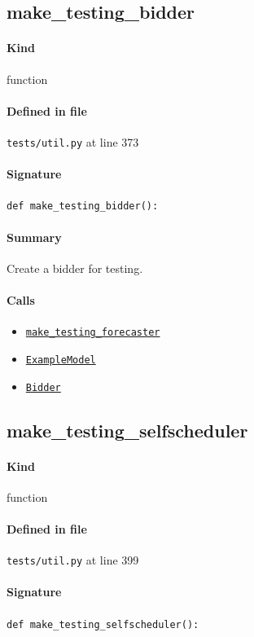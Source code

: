 \documentclass[11pt]{report}
\begin{document}
\subsection{make\_testing\_bidder}
\label{def:tests-util.py:make_testing_bidder:L373}
\paragraph{Kind} function
\paragraph{Defined in file} \texttt{tests/util.py} at line 373
\paragraph{Signature} \texttt{def make\_testing\_bidder():}
\paragraph{Summary} Create a bidder for testing.
\paragraph{Calls}
\begin{itemize}[leftmargin=*]
  \item \hyperref[def:tests-util.py:make_testing_forecaster:L337]{\texttt{make\_testing\_forecaster}}
  \item \hyperref[def:tests-util.py:ExampleModel:L25]{\texttt{ExampleModel}}
  \item \hyperref[def:bidder.py:Bidder:L1000]{\texttt{Bidder}}
\end{itemize}
\subsection{make\_testing\_selfscheduler}
\label{def:tests-util.py:make_testing_selfscheduler:L399}
\paragraph{Kind} function
\paragraph{Defined in file} \texttt{tests/util.py} at line 399
\paragraph{Signature} \texttt{def make\_testing\_selfscheduler():}
\end{document}
